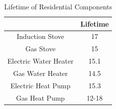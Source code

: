 \documentclass{article}
\begin{document}
\begin{table} [H]
    \centering
    \begin{tabular}{|c|c|}\hline
         &  Lifetime\\\hline
         Induction Stove&  17\\\hline
         Gas Stove&  15\\\hline
         Electric Water Heater&  15.1\\\hline
         Gas Water Heater&  14.5\\\hline
         Electric Heat Pump&  15.3\\\hline
         Gas Heat Pump&  12-18\\ \hline
    \end{tabular}
    \caption{Lifetime of Residential Components}
    \label{LifetimesComponents}
\end{table}

\newpage


        
\end{document}
